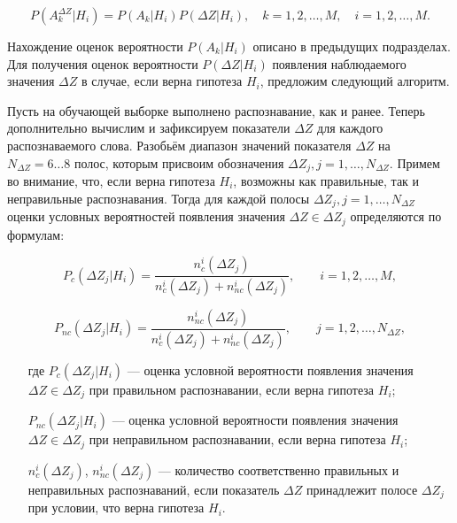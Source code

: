 \begin{equation}\label{eq:2_5_4_1}
P(A_k^{\Delta Z}|H_i) = P(A_k|H_i) P(\Delta Z|H_i),
\quad
k = 1, 2, \dots, M,
\quad
i = 1, 2, \dots, M.
\end{equation}

Нахождение оценок вероятности $P(A_k|H_i)$ описано в предыдущих подразделах.
Для получения оценок вероятности $P(\Delta Z|H_i)$ появления наблюдаемого значения $\Delta Z$ в случае, если верна гипотеза $H_i$, предложим следующий алгоритм.

Пусть на обучающей выборке выполнено распознавание, как и ранее.
Теперь дополнительно вычислим и зафиксируем показатели $\Delta Z$ для каждого распознаваемого слова.
Разобьём диапазон значений показателя $\Delta Z$ на $N_{\Delta Z} = 6 \dots 8$ полос, которым присвоим обозначения $\Delta Z_j, j = 1, \dots, N_{\Delta Z}$.
Примем во внимание, что, если верна гипотеза $H_i$, возможны как правильные, так и неправильные распознавания. Тогда для каждой полосы $\Delta Z_j, j = 1, \dots, N_{\Delta Z}$ оценки условных вероятностей появления значения $\Delta Z \in \Delta Z_j$ определяются по формулам:

\begin{equation}\label{eq:2_5_4_2}
P_c(\Delta Z_j|H_i) = \frac{n_c^i(\Delta Z_j)}{n_c^i(\Delta Z_j) + n_{nc}^i(\Delta Z_j)},
\qquad
i = 1, 2, \dots, M,
\end{equation}

\begin{equation}\label{eq:2_5_4_3}
P_{nc}(\Delta Z_j|H_i) = \frac{n_{nc}^i(\Delta Z_j)}{n_c^i(\Delta Z_j) + n_{nc}^i(\Delta Z_j)},
\qquad
j = 1, 2, \dots, N_{\Delta Z},
\end{equation}
\begin{itemize}[align=left,leftmargin=1.8em,itemindent=0pt,labelsep=0pt,labelwidth=1.8em]
	\item[где] $P_c(\Delta Z_j|H_i)$ --- оценка условной вероятности появления значения $\Delta Z \in \Delta Z_j$ при правильном распознавании, если верна гипотеза $H_i$;
	\item[] $P_{nc}(\Delta Z_j|H_i)$ --- оценка условной вероятности появления значения $\Delta Z \in \Delta Z_j$ при неправильном распознавании, если верна гипотеза $H_i$;
	\item[] $n_c^i(\Delta Z_j)$, $n_{nc}^i(\Delta Z_j)$ --- количество соответственно правильных и неправильных распознаваний, если показатель $\Delta Z$ принадлежит полосе $\Delta Z_j$ при условии, что верна гипотеза $H_i$.
\end{itemize}

